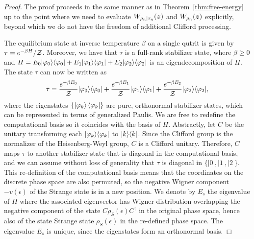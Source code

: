 \documentclass[pra,
aps,
twocolumn,
superscriptaddress,
groupedaddress,
nofootinbib,
reprint
]{revtex4-1}
\begin{document}
\begin{proof}
The proof proceeds in the same manner as in Theorem~\ref{thm:free-energy} up to the point where we need to evaluate $W_{\rho_n |\tau_n} (\bm{z})$ and $W_{\rho_n}(\bm{z})$ explicitly, beyond which we do not have the freedom of additional Clifford processing.

The equilibrium state at inverse temperature $\beta$ on a single qutrit is given by $\tau = e^{-\beta H} / \mathcal{Z}$. Moreover, we have that $\tau$ is a full-rank stabilizer state, where $\beta \geq 0$ and $H = E_0 |\varphi_0\rangle\langle\varphi_0| + E_1 |\varphi_1\rangle\langle\varphi_1| + E_2 |\varphi_2\rangle\langle\varphi_2|$ is an eigendecomposition of $H$.
The state $\tau$ can now be written as 
\begin{equation}
	\tau = \frac{e^{-\beta E_0}}{\mathcal{Z}} |\varphi_0\rangle\langle\varphi_0| + \frac{e^{-\beta E_1}}{\mathcal{Z}} |\varphi_1\rangle\langle\varphi_1| + \frac{e^{-\beta E_2}}{\mathcal{Z}} |\varphi_2\rangle\langle\varphi_2|,
\end{equation}
where the eigenstates $\{\ket{\varphi_k}\langle\varphi_k|\}$ are pure, orthonormal stabilizer states, which can be represented in terms of generalized Paulis. We are free to redefine the computational basis so it coincides with the basis of $H$. Abstractly, let $C$ be the unitary transforming each $|\varphi_k\rangle\langle\varphi_k|$ to $|k\rangle\langle k|$. Since the Clifford group is the normalizer of the Heisenberg-Weyl group, $C$ is a Clifford unitary. Therefore, $C$ maps $\tau$ to another stabilizer state that is diagonal in the computational basis, and we can assume without loss of generality that $\tau$ is diagonal in $\{|0\>,|1\>, |2\>\}$. This re-definition of the computational basis means that the coordinates on the discrete phase space are also permuted, so the negative Wigner component $-v(\epsilon)$ of the Strange state is in a new position. We denote by $E_s$ the eigenvalue of $H$ where the associated eigenvector has Wigner distribution overlapping the negative component of the state $C\rho_S(\epsilon)C^\dagger$ in the original phase space, hence also of the state Strange state $\rho_S(\epsilon)$ in the re-defined phase space. The eigenvalue $E_s$ is unique, since the eigenstates form an orthonormal basis.


\end{proof}
\end{document}
